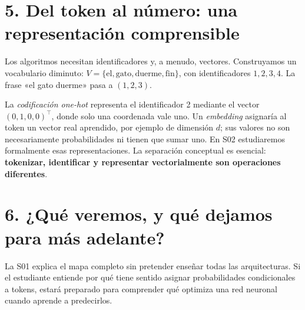 \section*{5. Del token al número: una representación comprensible}
Los algoritmos necesitan identificadores y, a menudo, vectores. Construyamos un vocabulario diminuto: $V=\{\text{el},\text{gato},\text{duerme},\text{fin}\}$, con identificadores $1,2,3,4$. La frase «el gato duerme» pasa a $(1,2,3)$.
\begin{center}
\end{center}
La \emph{codificación one-hot} representa el identificador 2 mediante el vector $(0,1,0,0)^\top$, donde solo una coordenada vale uno. Un \emph{embedding} asignaría al token un vector real aprendido, por ejemplo de dimensión $d$; sus valores no son necesariamente probabilidades ni tienen que sumar uno. En S02 estudiaremos formalmente esas representaciones. La separación conceptual es esencial: \textbf{tokenizar, identificar y representar vectorialmente son operaciones diferentes}.

\section*{6. ¿Qué veremos, y qué dejamos para más adelante?}
\begin{center}
\end{center}
La S01 explica el mapa completo sin pretender enseñar todas las arquitecturas. Si el estudiante entiende por qué tiene sentido asignar probabilidades condicionales a tokens, estará preparado para comprender qué optimiza una red neuronal cuando aprende a predecirlos.
\clearpage
